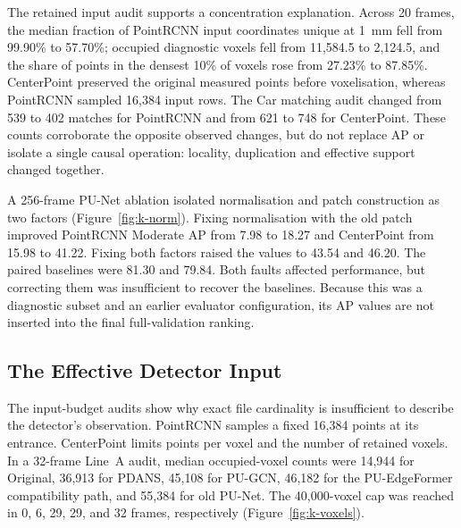 
The retained input audit supports a concentration explanation. Across 20
frames, the median fraction of PointRCNN input coordinates unique at
1~mm fell from 99.90\% to 57.70\%; occupied diagnostic voxels fell from
11,584.5 to 2,124.5, and the share of points in the densest 10\% of voxels
rose from 27.23\% to 87.85\%. CenterPoint preserved the original measured
points before voxelisation, whereas PointRCNN sampled 16,384 input rows.
The Car matching audit changed from 539 to 402 matches for PointRCNN
and from 621 to 748 for CenterPoint. These counts corroborate the
opposite observed changes, but do not replace AP or isolate a single
causal operation: locality, duplication and effective support changed
together.

A 256-frame PU-Net ablation isolated normalisation and patch construction
as two factors (Figure~\ref{fig:k-norm}). Fixing normalisation with the
old patch improved PointRCNN Moderate AP from 7.98 to 18.27 and
CenterPoint from 15.98 to 41.22. Fixing both factors raised the values
to 43.54 and 46.20. The paired baselines were 81.30 and 79.84.
Both faults affected performance, but correcting them was insufficient
to recover the baselines. Because this was a diagnostic subset and an
earlier evaluator configuration, its AP values are not inserted into
the final full-validation ranking.


\subsection{The Effective Detector Input}
\label{sec:budget-results}

The input-budget audits show why exact file cardinality is insufficient
to describe the detector's observation. PointRCNN samples a fixed 16,384
points at its entrance. CenterPoint limits points per voxel and the number
of retained voxels. In a 32-frame Line~A audit, median occupied-voxel
counts were 14,944 for Original, 36,913 for PDANS, 45,108 for PU-GCN,
46,182 for the PU-EdgeFormer compatibility path, and 55,384 for old
PU-Net. The 40,000-voxel cap was reached in 0, 6, 29, 29, and 32
frames, respectively (Figure~\ref{fig:k-voxels}).

